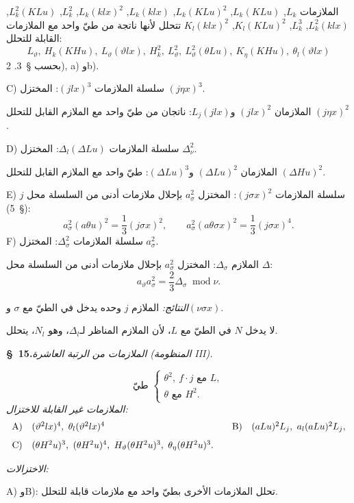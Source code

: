 \documentclass[11pt]{article}
\providecommand{\A}{\Delta}
\providecommand{\modu}[1]{\;\operatorname{mod} #1}
\begin{document}
الملازمات $L_k$, $L_k(KLu)$, $L_k(KLu)^2$, $L_k(klx)$, $L_k(klx)^2$, $L_k^2$, $L_k^2(KLu)$, $L_k^2(klx)$, $L_k^3$, $K_l(KLu)^2$, $K_l(klx)^2$ تتحلل لأنها ناتجة من طيّ واحد مع الملازمات القابلة للتحلل:
\[
L_\vartheta,
\ H_k(KHu),
\ L_\vartheta(\vartheta lx),
\ H_k^2,
\ L_\vartheta^2,
\ L_\vartheta^2(\theta Lu),
\ K_\eta(KHu),
\ \theta_l(\vartheta lx)
\]
بحسب \S\ 3. 2), a) وb).

C) سلسلة الملازمات $(jlx)^3$: المختزل $(j\eta x)^3$.

الملازمان $(jlx)^2$ و$L_j(jlx)$: ناتجان من طيّ واحد مع الملازم القابل للتحلل $(j\eta x)^2$.

D) سلسلة الملازمات $\A_l(\A Lu)$: المختزل $\A_\nu^2$.

الملازمان $(\A Lu)^2$ و$(\A Lu)^3$: طيّ واحد مع الملازم القابل للتحلل $(\A Hu)^2$.

E) سلسلة الملازمات $(j\sigma x)^2$: المختزل $a_\sigma^2$ بإحلال ملازمات أدنى من السلسلة محل $j$ (\S\ 5):
\[
a_\sigma^2(a\theta u)^2=\frac13(j\sigma x)^2,
\qquad
 a_\sigma^2(a\theta\sigma x)^2=\frac13(j\sigma x)^4.
\]
F) سلسلة الملازمات $\A_\sigma^2$: المختزل $a_\sigma^2$.

الملازم $\A_\sigma$: المختزل $a_\sigma^2$ بإحلال ملازمات أدنى من السلسلة محل $\A$:
\[
a_\vartheta a_\sigma^2=\frac23\A_\sigma\modu{\nu}.
\]

\noindent\emph{النتائج:} الملازم $j$ وحده يدخل في الطيّ مع $\sigma$ و$(\nu\sigma x)$.

لا يدخل $N$ في الطيّ مع $L$، لأن الملازم المناظر لـ$\A_l$، وهو $N_l$، يتحلل.

\begin{center}
\textbf{\S\ 15.}\quad\emph{الملازمات من الرتبة العاشرة (المنظومة III).}
\end{center}
\[
\text{طيّ }\left\{\begin{array}{l}
\theta^2,
\ f\cdot j\text{ مع }L,\\
\theta\text{ مع }H^2.
\end{array}\right.
\]
\noindent\emph{الملازمات غير القابلة للاختزال:}
\[
\begin{array}{c@{\quad}l@{\qquad}c@{\quad}l}
\text{A)}&(\vartheta^2lx)^4,
\ \theta_l(\vartheta^2lx)^4&
\text{B)}&(aLu)^2L_j,
\ a_l(aLu)^2L_j,\\[0.8em]
\text{C)}&(\theta H^2u)^3,
\ (\theta H^2u)^4,
\ H_\vartheta(\theta H^2u)^3,
\ \theta_\eta(\theta H^2u)^3.
\end{array}
\]

\noindent\emph{الاختزالات:}

A) وB): تحلل الملازمات الأخرى بطيّ واحد مع ملازمات قابلة للتحلل.
\end{document}
